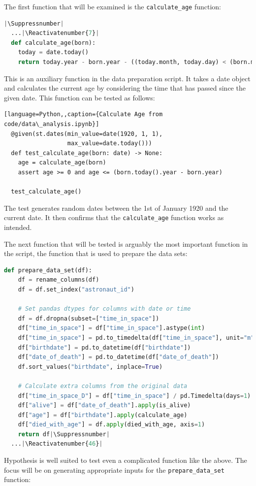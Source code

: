 \documentclass[runningheads]{llncs}
\makeatletter
\let\origthelstnumber\thelstnumber
\newcommand*\Suppressnumber{%
  \lst@AddToHook{OnNewLine}{%
    \let\thelstnumber\relax%
     \advance\c@lstnumber-\@ne\relax%
    }%
}
\newcommand*\Reactivatenumber[1]{%
  \setcounter{lstnumber}{\numexpr#1-1\relax}
  \lst@AddToHook{OnNewLine}{%
   \let\thelstnumber\origthelstnumber%
   \refstepcounter{lstnumber}%
  }%
}
\makeatother
\begin{document}
\newpage
\noindent The first function that will be examined is the \texttt{calculate\_age} function:

\begin{lstlisting}[language=Python,caption={Calculate Age from code/data\_analysis.ipynb}]
  |\Suppressnumber|
  ...|\Reactivatenumber{7}|
  def calculate_age(born):
    today = date.today()
    return today.year - born.year - ((today.month, today.day) < (born.month, born.day))
\end{lstlisting}
This is an auxiliary function in the data preparation script. It takes a date object and calculates the current age by considering the time that has passed since the given date. This function can be tested as follows:

\begin{lstlisting}[language=Python,,caption={Calculate Age from code/data\_analysis.ipynb}]
  @given(st.dates(min_value=date(1920, 1, 1), 
                  max_value=date.today()))
  def test_calculate_age(born: date) -> None:
    age = calculate_age(born)
    assert age >= 0 and age <= (born.today().year - born.year)
  
  test_calculate_age()
\end{lstlisting}
The test generates random dates between the 1st of January 1920 and the current date. It then confirms that the \texttt{calculate\_age} function works as intended.

\vspace{5mm}
\noindent The next function that will be tested is arguably the most important function in the script, the function that is used to prepare the data sets:

\begin{lstlisting}[language=Python,caption={Prepare Data Set from code/data\_analysis.ipynb}]
  def prepare_data_set(df):
    df = rename_columns(df)
    df = df.set_index("astronaut_id")

    # Set pandas dtypes for columns with date or time
    df = df.dropna(subset=["time_in_space"])
    df["time_in_space"] = df["time_in_space"].astype(int)
    df["time_in_space"] = pd.to_timedelta(df["time_in_space"], unit="m")
    df["birthdate"] = pd.to_datetime(df["birthdate"])
    df["date_of_death"] = pd.to_datetime(df["date_of_death"])
    df.sort_values("birthdate", inplace=True)

    # Calculate extra columns from the original data
    df["time_in_space_D"] = df["time_in_space"] / pd.Timedelta(days=1)
    df["alive"] = df["date_of_death"].apply(is_alive)
    df["age"] = df["birthdate"].apply(calculate_age)
    df["died_with_age"] = df.apply(died_with_age, axis=1)
    return df|\Suppressnumber|
  ...|\Reactivatenumber{46}|

\end{lstlisting}
Hypothesis is well suited to test even a complicated function like the above. The focus will be on generating appropriate inputs for the \texttt{prepare\_data\_set} function:
\end{document}
